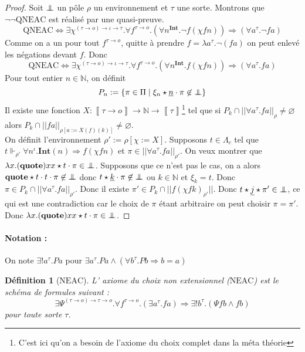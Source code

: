 \documentclass[a4paper,12pt]{article}
\newtheorem{defi}[theo]{Définition}
\theoremstyle{rmqstyle}
\newcommand{\N}{\mathbb{N}}
\newcommand{\set}[1]{\{#1\}}
\newcommand{\abss}[1]{\lvert \lvert#1\rvert \rvert}
\newcommand{\itp}[1]{\left\llbracket#1\right\rrbracket}
\renewcommand{\int}{\mathbf{Int}}
\renewcommand{\implies}{\Rightarrow}
\renewcommand{\iff}{\Leftrightarrow}
\newcommand{\pole}{{\protect\mathpalette{\protect\polehelper}{\bot}}} \def\polehelper#1#2{\mathrel{\rlap{$#1#2$}\mkern3mu{#1#2}}}
\newcommand{\Kri}[1]{\underline{#1}}
\renewcommand{\quote}{\mathbf{quote}}
\newcommand{\QNEAC}{\mathrm{QNEAC}}
\newcommand{\NEAC}{\mathrm{NEAC}}
\begin{document}
\begin{proof}
Soit $\pole$ un pôle $\rho$ un environnement et $\tau$ une sorte. Montrons que $\neg \neg \QNEAC$ est réalisé par une quasi-preuve. 
$$\QNEAC \iff  \exists \chi^{(\tau \to o) \to \iota \to \tau}.  \forall f^{\tau \to o}. (\forall n^\int. \neg f(\chi f n)) \implies (\forall a^\tau. \neg fa)$$
Comme on a un pour tout $f^{\tau \to o}$, quitte à prendre $f = \lambda a^\tau. \neg (fa)$ on peut enlevé les négations devant $f$. Donc 
$$\QNEAC \iff  \exists \chi^{(\tau \to o) \to \iota \to \tau}.  \forall f^{\tau \to o}. (\forall n^\int. f(\chi f n)) \implies (\forall a^\tau. fa)$$
Pour tout entier $n \in \N$, on définit 
$$P_n := \set{\pi \in \Pi \mid \xi_n \star \Kri{n} \cdot \pi \not \in \pole}$$
Il existe une fonction $X : \itp{\tau \to o} \to \N \to \itp{\tau}$\footnote{C'est ici qu'on a besoin de l'axiome du choix complet dans la méta théorie} tel que si $P_k \cap \abss{\forall a^\tau. fa}_\rho \neq \varnothing$ alors $P_k \cap \abss{fa}_{\rho[a := X (f) (k)]} \neq \varnothing$.\\
On définit l'environnement $\rho' := \rho[\chi := X]$. Supposons $t \in \Lambda_c$ tel que $t \Vdash_{\rho'} \forall n^\iota. \int(n) \implies f(\chi f n)$ et $\pi \in \abss{\forall a^\tau. fa}_{\rho'}$. On veux montrer que $\lambda x. (\quote) x x \star t \cdot \pi \in \pole$. Supposons que ce n'est pas le cas, on a alors $\quote \star t \cdot t \cdot \pi \not \in \pole$ donc $t \star \Kri{k} \cdot \pi \not \in \pole$ ou $k \in \N$ et $\xi_k = t$. Donc $\pi \in P_k \cap \abss{\forall a^\tau. fa}_{\rho'}$. Donc il existe $\pi' \in P_k \cap \abss{f (\chi f k)_{\rho'}}$. Donc $t \star \Kri{j} \star \pi' \in \pole$, ce qui est une contradiction car le choix de $\pi$ étant arbitraire on peut choisir $\pi = \pi'$. Donc $\lambda x. (\quote) x x \star t \cdot \pi \in \pole$.
\end{proof}

\paragraph{Notation :} On note $\exists ! a^\tau.Pa$ pour $\exists a^\tau. Pa \land (\forall b^\tau. Pb \implies b = a)$

\begin{defi}[$\NEAC$]
L' axiome du choix non extensionnel ($\NEAC$) est le schéma de formules suivant :
$$\exists \Psi^{(\tau \to o) \to \tau \to o}. \forall f^{\tau \to o}.( \exists a^\tau. fa) \implies \exists ! b^\tau.(\Psi f b \land f b)$$
pour toute sorte $\tau$. 
\end{defi}
\end{document}
